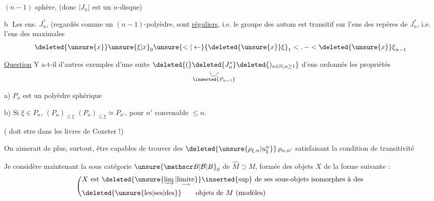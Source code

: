  $(n-1)$ sphère, (donc $|J_n|$ est un $n$-disque)

\textcircled{b} Les ens.  $J_n^*$, (regardés comme un $(n-1)$-polyèdre, sont \uline{réguliers}, i.e. le groupe des autom est transitif sur l'ens des repères de $J_n^*$, i.e. l'ens des  maximales
\[
{\deleted{\unsure{x}}\unsure{\xi|x}}_0\unsure{<|\leftarrow}{\deleted{\unsure{x}}\xi}_1<.\,-<{\deleted{\unsure{x}}\xi}_{n-1}
\]

\uline{Question} Y a-t-il d'autres exemples d'une suite  $ \deleted{(}\underset{\substack{\llcorner\mkern-5mu\underline{\phantom{J_n^*}}\mkern-5mu\lrcorner\\\inserted{P_{n-1}}}}{\deleted{J_n^*}}\deleted{)_{n\in\mathbb N,n\geq1}}$  d'ens ordonnés  les propriétés

a) $P_n$ est un polyèdre \uline{} sphérique

b) Si $\xi\in P_n$,   $(P_n)_{\leq\xi}$  $(P_n)_{\leq\xi}\simeq P_{n'}$, pour $n'$ convenable $\leq n$.

( doit etre dans les livres de Coxeter !)

On aimerait de plus, surtout, être capables de trouver des $\deleted{\unsure{\rho_{\xi,n}|u^n_\xi}}\,\rho_{n,n'}$ satisfaisant la condition de transitivité

Je considère maintenant la sous catégorie ${\unsure{\mathscr B|\mathcal B|B}}_0$ de $\widehat M\supset M$, formée des objets $X$ de la forme suivante :
\[
\left(\begin{aligned}
&X\text{ est }\deleted{\unsure{\varinjlim|\underset{\longrightarrow}{\text{limite}}}}\inserted{\text{sup}}\text{ de ses sous-objets isomorphes à des}\\
&\deleted{\text{\unsure{les|ses|des}}}\qquad\text{objets de }M\text{ (modèles)}
\end{aligned}\right.
\]

